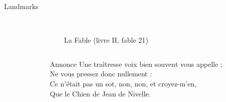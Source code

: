 \documentclass{LaBRI_poster}
\begin{document}
\begin{frame}[t]
\begin{columns}[t]
\begin{column}{\twothirdcolwidth}
\begin{block}{Landmarks}
    \\[2.0cm]
    \\[2cm]
 \end{block}
\end{column}

\begin{column}{\sepwidth}\end{column} %

\end{columns}


\begin{columns}[t] 

\begin{column}{\sepwidth}\end{column} %

\begin{column}{\onecolwidth}
\begin{block}{La Fable \hspace{2cm} \small{(livre II, fable 21)}}
\end{block}
\end{column}

\begin{column}{\sepwidth}\end{column} %

\end{columns}


\begin{columns}[t]

\begin{column}{\sepwidth}\end{column} %


\begin{column}{\twocolwidth}

\begin{block}{Annonce}
Une traîtresse voix bien souvent vous appelle ;\\
Ne vous pressez donc nullement :\\
Ce n’était pas un sot, non, non, et croyez-m’en,\\
Que le Chien de Jean de Nivelle.
\end{block}


\end{column}
\end{columns}
\end{frame}
\end{document}
